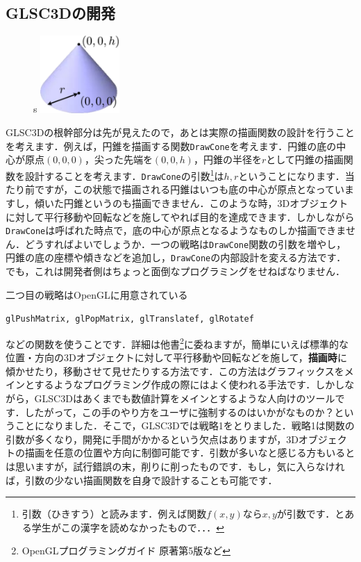 \documentclass[platex,a4paper,12pt]{jsarticle}%
\begin{document}
\subsection{GLSC3Dの開発}

\begin{figure}s
\vspace{-1\baselineskip}
	\includegraphics[width=30mm]{003.eps}
\end{figure}

GLSC3Dの根幹部分は先が見えたので，あとは実際の描画関数の設計を行うことを考えます．例えば，円錐を描画する関数\verb|DrawCone|を考えます．円錐の底の中心が原点$(0,0,0)$，尖った先端を$(0,0,h)$，円錐の半径を$r$として円錐の描画関数を設計することを考えます．\verb|DrawCone|の引数\footnote{引数（ひきすう）と読みます．例えば関数$f(x,y)$なら$x,y$が引数です．とある学生がこの漢字を読めなかったもので．．．}は$h,r$ということになります．当たり前ですが，この状態で描画される円錐はいつも底の中心が原点となっていますし，傾いた円錐というのも描画できません．このような時，3Dオブジェクトに対して平行移動や回転などを施してやれば目的を達成できます．しかしながら\verb|DrawCone|は呼ばれた時点で，底の中心が原点となるようなものしか描画できません．どうすればよいでしょうか．一つの戦略は\verb|DrawCone|関数の引数を増やし，円錐の底の座標や傾きなどを追加し，\verb|DrawCone|の内部設計を変える方法です．でも，これは開発者側はちょっと面倒なプログラミングをせねばなりません．

二つ目の戦略はOpenGLに用意されている

\noindent
\verb|glPushMatrix, glPopMatrix, glTranslatef, glRotatef|

\noindent
などの関数を使うことです．詳細は他書\footnote{OpenGLプログラミングガイド 原著第5版など}に委ねますが，簡単にいえば標準的な位置・方向の3Dオブジェクトに対して平行移動や回転などを施して，{\bf 描画時}に傾かせたり，移動させて見せたりする方法です．この方法はグラフィックスをメインとするようなプログラミング作成の際にはよく使われる手法です．しかしながら，GLSC3Dはあくまでも数値計算をメインとするような人向けのツールです．したがって，この手のやり方をユーザに強制するのはいかがなものか？ということになりました．そこで，GLSC3Dでは戦略1をとりました．戦略1は関数の引数が多くなり，開発に手間がかかるという欠点はありますが，3Dオブジェクトの描画を任意の位置や方向に制御可能です．引数が多いなと感じる方もいるとは思いますが，試行錯誤の末，削りに削ったものです．もし，気に入らなければ，引数の少ない描画関数を自身で設計することも可能です．
\end{document}
